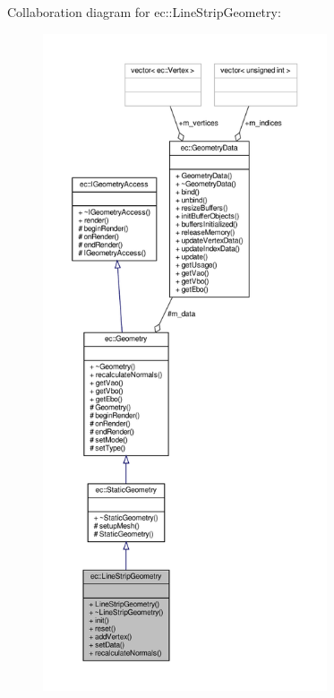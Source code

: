 Collaboration diagram for ec\+:\+:Line\+Strip\+Geometry\+:\nopagebreak
\begin{figure}[H]
\begin{center}
\leavevmode
\includegraphics[height=550pt]{classec_1_1_line_strip_geometry__coll__graph}
\end{center}
\end{figure}
